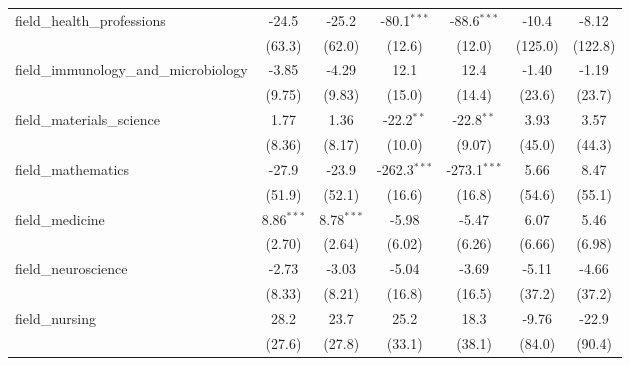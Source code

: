 \begin{tabular}{lcccccc}
   field\_health\_professions                                  & -24.5        & -25.2        & -80.1$^{***}$  & -88.6$^{***}$  & -10.4   & -8.12\\   
                                                               & (63.3)       & (62.0)       & (12.6)         & (12.0)         & (125.0) & (122.8)\\   
   field\_immunology\_and\_microbiology                        & -3.85        & -4.29        & 12.1           & 12.4           & -1.40   & -1.19\\   
                                                               & (9.75)       & (9.83)       & (15.0)         & (14.4)         & (23.6)  & (23.7)\\   
   field\_materials\_science                                   & 1.77         & 1.36         & -22.2$^{**}$   & -22.8$^{**}$   & 3.93    & 3.57\\   
                                                               & (8.36)       & (8.17)       & (10.0)         & (9.07)         & (45.0)  & (44.3)\\   
   field\_mathematics                                          & -27.9        & -23.9        & -262.3$^{***}$ & -273.1$^{***}$ & 5.66    & 8.47\\   
                                                               & (51.9)       & (52.1)       & (16.6)         & (16.8)         & (54.6)  & (55.1)\\   
   field\_medicine                                             & 8.86$^{***}$ & 8.78$^{***}$ & -5.98          & -5.47          & 6.07    & 5.46\\   
                                                               & (2.70)       & (2.64)       & (6.02)         & (6.26)         & (6.66)  & (6.98)\\   
   field\_neuroscience                                         & -2.73        & -3.03        & -5.04          & -3.69          & -5.11   & -4.66\\   
                                                               & (8.33)       & (8.21)       & (16.8)         & (16.5)         & (37.2)  & (37.2)\\   
   field\_nursing                                              & 28.2         & 23.7         & 25.2           & 18.3           & -9.76   & -22.9\\   
                                                               & (27.6)       & (27.8)       & (33.1)         & (38.1)         & (84.0)  & (90.4)\\   

\end{tabular}
